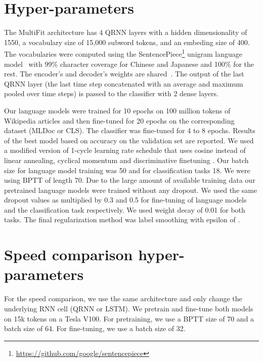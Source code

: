 \documentclass[11pt,a4paper]{article}
\begin{document}



\newpage
\newpage

\appendix

\section{Hyper-parameters}
The MultiFit architecture has 4 QRNN layers with a hidden dimensionality of 1550, a vocabulary size of 15,000 subword tokens, and an embeding size of 400. The vocabularies were computed using the SentencePiece\footnote{\url{https://github.com/google/sentencepiece}} unigram language model~\cite{Kudo2018} with 99\% character coverage for Chinese and Japanese and 100\% for the rest. The encoder's and decoder's weights are shared~\cite{Press2017}. The output of the last QRNN layer (the last time step concatenated with an average and maximum pooled over time steps) is passed to the classifier with 2 dense layers.

Our language models were trained for 10 epochs on 100 million tokens of Wikipedia articles and then fine-tuned for 20 epochs on the corresponding dataset (MLDoc or CLS). The classifier was fine-tuned for 4 to 8 epochs. Results of the best model based on accuracy on the validation set are reported. We used a modified version of 1-cycle learning rate schedule \cite{smith2018disciplined} that uses cosine instead of linear annealing, cyclical momentum and discriminative finetuning \cite{Howard2018}. Our batch size for language model training was 50 and for classification tasks 18. We were using BPTT of length 70. Due to the large amount of available training data our pretrained language models were trained without any dropout. We used the same dropout values as \cite{Howard2018} multiplied by 0.3 and 0.5 for fine-tuning of language models and the classification task respectively. We used weight decay of 0.01 for both tasks. The final regularization method was label smoothing \cite{Szegedy2016} with epsilon of .

\section{Speed comparison hyper-parameters}

For the speed comparison, we use the same architecture and only change the underlying RNN cell (QRNN or LSTM). We pretrain and fine-tune both models on 15k tokens on a Tesla V100. For pretraining, we use a BPTT size of 70 and a batch size of 64. For fine-tuning, we use a batch size of 32.
\end{document}
